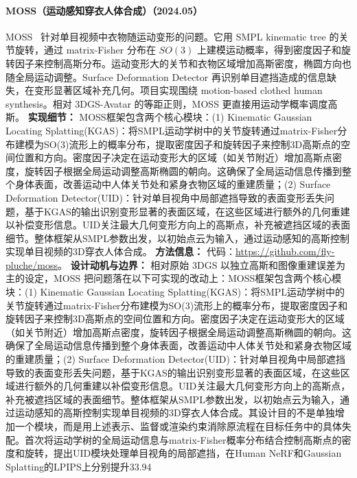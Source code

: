 \paragraph{MOSS（运动感知穿衣人体合成）（2024.05）}
MOSS~\cite{2405_12806} 针对单目视频中衣物随运动变形的问题。它用 SMPL kinematic tree 的关节旋转，通过 matrix-Fisher 分布在 $SO(3)$ 上建模运动概率，得到密度因子和旋转因子来控制高斯分布。运动变形大的关节和衣物区域增加高斯密度，椭圆方向也随全局运动调整。Surface Deformation Detector 再识别单目遮挡造成的信息缺失，在变形显著区域补充几何。项目实现围绕 motion-based clothed human synthesis。相对 3DGS-Avatar 的等距正则，MOSS 更直接用运动学概率调度高斯。
\textbf{实现细节：} MOSS框架包含两个核心模块：(1) Kinematic Gaussian Locating Splatting(KGAS)：将SMPL运动学树中的关节旋转通过matrix-Fisher分布建模为SO(3)流形上的概率分布，提取密度因子和旋转因子来控制3D高斯点的空间位置和方向。密度因子决定在运动变形大的区域（如关节附近）增加高斯点密度，旋转因子根据全局运动调整高斯椭圆的朝向。这确保了全局运动信息传播到整个身体表面，改善运动中人体关节处和紧身衣物区域的重建质量；(2) Surface Deformation Detector(UID)：针对单目视角中局部遮挡导致的表面变形丢失问题，基于KGAS的输出识别变形显著的表面区域，在这些区域进行额外的几何重建以补偿变形信息。UID关注最大几何变形方向上的高斯点，补充被遮挡区域的表面细节。整体框架从SMPL参数出发，以初始点云为输入，通过运动感知的高斯控制实现单目视频的3D穿衣人体合成。
\textbf{方法信息：} 代码：\url{https://github.com/fly-pluche/moss}。
\textbf{设计动机与边界：} 相对原始 3DGS 以独立高斯和图像重建误差为主的设定，MOSS 把问题落在以下可实现的改动上：MOSS框架包含两个核心模块：(1) Kinematic Gaussian Locating Splatting(KGAS)：将SMPL运动学树中的关节旋转通过matrix-Fisher分布建模为SO(3)流形上的概率分布，提取密度因子和旋转因子来控制3D高斯点的空间位置和方向。密度因子决定在运动变形大的区域（如关节附近）增加高斯点密度，旋转因子根据全局运动调整高斯椭圆的朝向。这确保了全局运动信息传播到整个身体表面，改善运动中人体关节处和紧身衣物区域的重建质量；(2) Surface Deformation Detector(UID)：针对单目视角中局部遮挡导致的表面变形丢失问题，基于KGAS的输出识别变形显著的表面区域，在这些区域进行额外的几何重建以补偿变形信息。UID关注最大几何变形方向上的高斯点，补充被遮挡区域的表面细节。整体框架从SMPL参数出发，以初始点云为输入，通过运动感知的高斯控制实现单目视频的3D穿衣人体合成。其设计目的不是单独增加一个模块，而是用上述表示、监督或渲染约束消除原流程在目标任务中的具体失配。首次将运动学树的全局运动信息与matrix-Fisher概率分布结合控制高斯点的密度和旋转，提出UID模块处理单目视角的局部遮挡，在Human NeRF和Gaussian Splatting的LPIPS上分别提升33.94%
